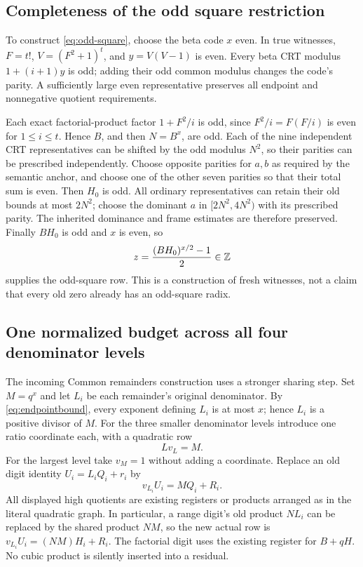 \subsection{Completeness of the odd square restriction}
To construct \eqref{eq:odd-square}, choose the beta code $x$ even.
In true witnesses, $F=t!$, $V=(F^2+1)^t$, and $y=V(V-1)$ is even.
Every beta CRT modulus $1+(i+1)y$ is odd; adding their odd common modulus
changes the code's parity. A sufficiently large even representative
preserves all endpoint and nonnegative quotient requirements.

Each exact factorial-product factor $1+F^2/i$ is odd, since
$F^2/i=F(F/i)$ is even for $1\le i\le t$. Hence $B$, and then $N=B^x$,
are odd. Each of the nine independent CRT representatives can be shifted
by the odd modulus $N^2$, so their parities can be prescribed independently.
Choose opposite parities for $a,b$ as required by the semantic anchor,
and choose one of the other seven parities so that their total sum is even.
Then $H_0$ is odd. All ordinary representatives can retain their old bounds
at most $2N^2$; choose the dominant $a$ in $[2N^2,4N^2)$ with its prescribed
parity. The inherited dominance and frame estimates are therefore preserved.
Finally $BH_0$ is odd and $x$ is even, so
\[
 z=\frac{(BH_0)^{x/2}-1}{2}\in\mathbb Z
\]
supplies the odd-square row. This is a construction of fresh witnesses,
not a claim that every old zero already has an odd-square radix.

\subsection{One normalized budget across all four denominator levels}
The incoming Common remainders construction uses a stronger sharing step.
Set $M=q^x$ and let $L_i$ be each remainder's original denominator.
By \eqref{eq:endpointbound}, every exponent defining $L_i$ is at most $x$;
hence $L_i$ is a positive divisor of $M$. For the three smaller denominator
levels introduce one ratio coordinate each, with a quadratic row
\[
 L v_L=M.
\]
For the largest level take $v_M=1$ without adding a coordinate. Replace
an old digit identity $U_i=L_iQ_i+r_i$ by
\begin{equation}\label{eq:normalized-digit}
 v_{L_i}U_i=MQ_i+R_i.
\end{equation}
All displayed high quotients are existing registers or products arranged as
in the literal quadratic graph. In particular, a range digit's old product
$NL_i$ can be replaced by the shared product $NM$, so the new actual row is
$v_{L_i}U_i=(NM)H_i+R_i$. The factorial digit uses the existing register
for $B+qH$. No cubic product is silently inserted into a residual.

